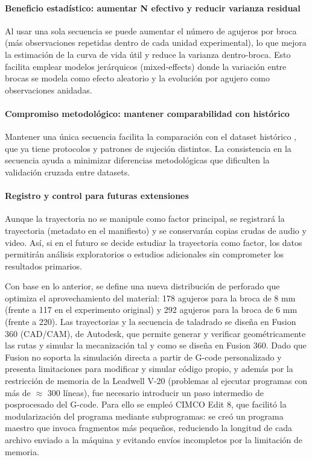 \documentclass[12pt, letterpaper]{report}
\begin{document}
\paragraph{Beneficio estadístico: aumentar N efectivo y reducir varianza residual}

Al usar una sola secuencia se puede aumentar el número de agujeros por broca (más observaciones repetidas dentro de cada unidad experimental), lo que mejora la estimación de la curva de vida útil y reduce la varianza dentro-broca. Esto facilita emplear modelos jerárquicos (mixed-effects) donde la variación entre brocas se modela como efecto aleatorio y la evolución por agujero como observaciones anidadas.

\paragraph{Compromiso metodológico: mantener comparabilidad con histórico}

Mantener una única secuencia facilita la comparación con el dataset histórico , que ya tiene protocolos y patrones de sujeción distintos. La consistencia en la secuencia ayuda a minimizar diferencias metodológicas que dificulten la validación cruzada entre datasets.

\paragraph{Registro y control para futuras extensiones}

Aunque la trayectoria no se manipule como factor principal, se registrará la trayectoria (metadato en el manifiesto) y se conservarán copias crudas de audio y video. Así, si en el futuro se decide estudiar la trayectoria como factor, los datos permitirán análisis exploratorios o estudios adicionales sin comprometer los resultados primarios.

Con base en lo anterior, se define una nueva distribución de perforado que optimiza el aprovechamiento del material: 178 agujeros para la broca de 8 mm (frente a 117 en el experimento original) y 292 agujeros para la broca de 6 mm (frente a 220). Las trayectorias y la secuencia de taladrado se diseña en Fusion 360 (CAD/CAM),\textbf{ }de Autodesk, que permite generar y verificar geométricamente las rutas y simular la mecanización tal y como se diseña en Fusion 360. Dado que Fusion no soporta la simulación directa a partir de G-code personalizado y presenta limitaciones para modificar y simular código propio, y además por la restricción de memoria de la Leadwell V-20 (problemas al ejecutar programas con más de $\approx$ 300 líneas), fue necesario introducir un paso intermedio de posprocesado del G-code. Para ello se empleó CIMCO Edit 8, que facilitó la modularización del programa mediante subprogramas: se creó un programa maestro que invoca fragmentos más pequeños, reduciendo la longitud de cada archivo enviado a la máquina y evitando envíos incompletos por la limitación de memoria.
\end{document}
